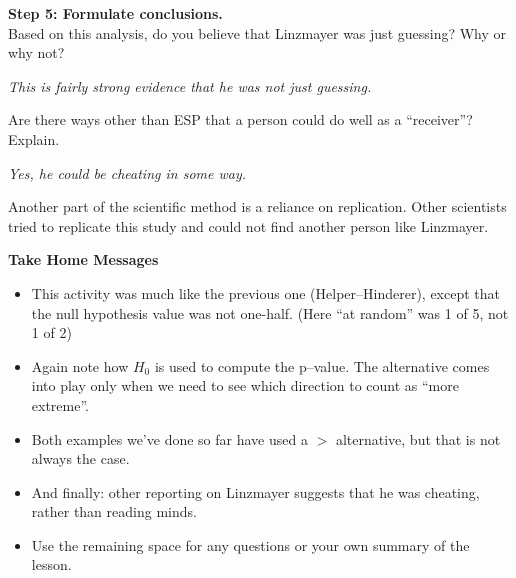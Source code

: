 
{\bf Step 5: Formulate conclusions.}\\
 Based on this analysis, do you believe  that Linzmayer was just
 guessing? Why or why not? 

\begin{students}
  \vspace{2cm}
\end{students}
\begin{key}
{\it This is fairly strong evidence that he was not just guessing.}
\end{key}

Are there ways other than ESP that a person could do well as a ``receiver''?
Explain. 

\begin{students}
  \vspace{1.2cm}
\end{students}
\begin{key}
{\it Yes, he could be cheating in some way.}
\end{key}


Another part of the scientific method is a reliance on replication.
Other scientists tried to replicate this study and could not find
another person like Linzmayer. 



{\bf Take Home Messages}
\begin{itemize}
\item 
This activity was much like the previous one (Helper--Hinderer),
except that the null hypothesis value was not one-half. (Here ``at
random'' was 1 of 5, not 1 of 2)
\item 
Again note how $H_0$ is used to compute the p--value.  The alternative
comes into play only when we need to see which direction to count as
``more extreme''.
\item 
Both examples we've done so far have used a $>$ alternative, but that
is not always the case.
\item 
And finally: other reporting on Linzmayer suggests that he was
cheating, rather than reading minds.
 \item 
  Use the remaining space for any questions or your own summary of the
  lesson. 
  
\end{itemize}





